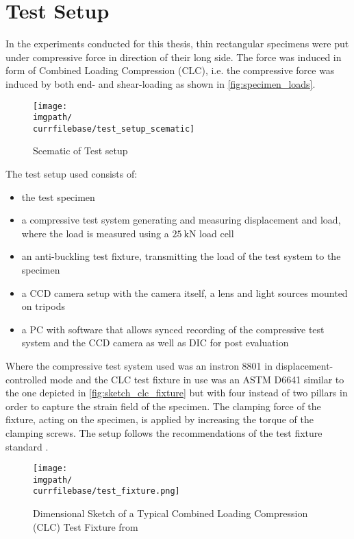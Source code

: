 \chapter{Test Setup}
\label{chap:\currfilebase}

In the experiments conducted for this thesis, thin rectangular specimens were put under compressive force in direction of their long side. The force was induced in form of Combined Loading Compression (CLC), i.e. the compressive force was induced by both end- and shear-loading as shown in \autoref{fig:specimen_loads}.

\begin{figure}[!ht]
    \centering
    \texttt{[image: \\imgpath/\\currfilebase/test\_setup\_scematic]}
    \caption{Scematic of Test setup}
    \label{fig:test_setup_scematic}
\end{figure}

The test setup used consists of:
\begin{itemize}
    \item the test specimen
    \item a compressive test system generating and measuring displacement and load, where the load is measured using a $\SI{25}{\kilo\newton}$ load cell
    \item an anti-buckling test fixture, transmitting the load of the test system to the specimen
    \item a CCD camera setup with the camera itself, a lens and light sources mounted on tripods
    \item a PC with software that allows synced recording of the compressive test system and the CCD camera as well as DIC for post evaluation
\end{itemize}

Where the compressive test system used was an instron 8801 in displacement-controlled mode and the CLC test fixture in use was an ASTM D6641 similar to the one depicted in \autoref{fig:sketch_clc_fixture} but with four instead of two pillars in order to capture the strain field of the specimen. The clamping force of the fixture, acting on the specimen, is applied by increasing the torque of the clamping screws. The setup follows the recommendations of the test fixture standard \cite{D6641standard}.

\begin{figure}[!ht]
    \centering
    \texttt{[image: \\imgpath/\\currfilebase/test\_fixture.png]}
    \caption{Dimensional Sketch of a Typical Combined Loading Compression (CLC) Test Fixture from \cite{D6641standard}}
    \label{fig:sketch_clc_fixture}
\end{figure}


